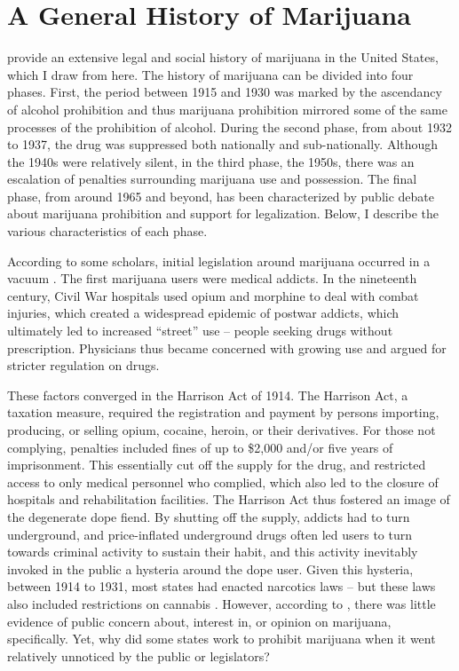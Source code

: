 \section{A General History of Marijuana}

\citet{bonnie_and_whitebread_1970} provide an extensive legal and social history of marijuana in the United States, which I draw from here. The history of marijuana can be divided into four phases. First, the period between 1915 and 1930 was marked by the ascendancy of alcohol prohibition and thus marijuana prohibition mirrored some of the same processes of the prohibition of alcohol. During the second phase, from about 1932 to 1937, the drug was suppressed both nationally and sub-nationally. Although the 1940s were relatively silent, in the third phase, the 1950s, there was an escalation of penalties surrounding marijuana use and possession. The final phase, from around 1965 and beyond, has been characterized by public debate about marijuana prohibition and support for legalization. Below, I describe the various characteristics of each phase.



According to some scholars, initial legislation around marijuana occurred in a vacuum \citep{bonnie_and_whitebread_1970}. The first marijuana users were medical addicts. In the nineteenth century, Civil War hospitals used opium and morphine to deal with combat injuries, which created a widespread epidemic of postwar addicts, which ultimately led to increased ``street'' use -- people seeking drugs without prescription. Physicians thus became concerned with growing use and argued for stricter regulation on drugs. 

These factors converged in the Harrison Act of 1914. The Harrison Act, a taxation measure, required the registration and payment by persons importing, producing, or selling opium, cocaine, heroin, or their derivatives. For those not complying, penalties included fines of up to \$2,000 and/or five years of imprisonment. This essentially cut off the supply for the drug, and restricted access to only medical personnel who complied, which also led to the closure of hospitals and rehabilitation facilities. The Harrison Act thus fostered an image of the degenerate dope fiend. By shutting off the supply, addicts had to turn underground, and price-inflated underground drugs often led users to turn towards criminal activity to sustain their habit, and this activity inevitably invoked in the public a hysteria around the dope user. Given this hysteria, between 1914 to 1931, most states had enacted narcotics laws -- but these laws also included restrictions on cannabis \citep{bonnie_and_whitebread_1970}. However, according to \citet{bonnie_and_whitebread_1970}, there was little evidence of public concern about, interest in, or opinion on marijuana, specifically. Yet, why did some states work to prohibit marijuana when it went relatively unnoticed by the public or legislators?

